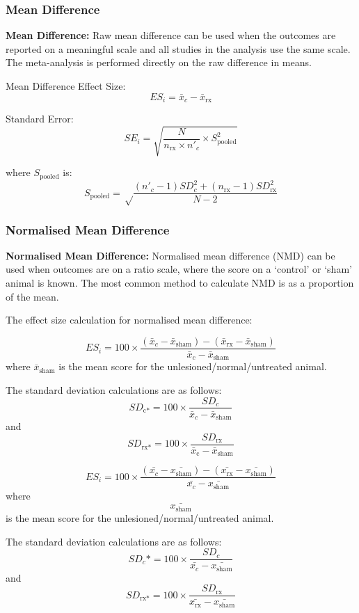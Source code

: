 \documentclass[
]{book}
\begin{document}
\hypertarget{mean-difference}{%
\subsubsection{Mean Difference}\label{mean-difference}}

\textbf{Mean Difference:} Raw mean difference can be used when the outcomes are reported on a meaningful scale and all studies in the analysis use the same scale. The meta-analysis is performed directly on the raw difference in means.

Mean Difference Effect Size:
\[ ES_i = \bar{x}_c - \bar{x}_\text{rx}\]

Standard Error:
\[ SE_i = \sqrt{\frac {N}{n_{\text{rx}} \times n'_c} \times S_{\text{pooled}}^2} \]

where \(S_{\text{pooled}}\) is:
\[S_{\text{pooled}} = \sqrt \frac {(n'_c - 1)SD_c^2 + (n_{\text{rx}} - 1)SD_{\text{rx}}^2}{N -2} \]

\hypertarget{normalised-mean-difference}{%
\subsubsection{Normalised Mean Difference}\label{normalised-mean-difference}}

\textbf{Normalised Mean Difference:} Normalised mean difference (NMD) can be used when outcomes are on a ratio scale, where the score on a `control' or `sham' animal is known. The most common method to calculate NMD is as a proportion of the mean.

The effect size calculation for normalised mean difference:

\[ES_i= 100 \times  \frac {(\bar{x}_c - \bar{x}_\text{sham}) - (\bar{x}_\text{rx} - \bar{x}_\text{sham})}{\bar{x}_c - \bar{x}_\text{sham}}\] where \(\bar{x}_\text{sham}\) is the mean score for the unlesioned/normal/untreated animal.

The standard deviation calculations are as follows:
\[SD_\text{c*} = 100 \times \frac {SD_c}{\bar{x}_c - \bar{x}_\text{sham}}\] and \[SD_\text{rx*} = 100 \times \frac {SD_\text{rx}}{\bar{x}_\text{c} - \bar{x}_\text{sham}}\]

\[ES_i= 100 \times  \frac {(\bar{x_c} - \bar{x_\text{sham}}) - (\bar{x_\text{rx}} - \bar{x_\text{sham}})}{\bar{x_c} - \bar{x_\text{sham}}} \] where \[\bar{x_\text{sham}} \] is the mean score for the unlesioned/normal/untreated animal.

The standard deviation calculations are as follows:
\[SD_c* = 100 \times \frac {SD_c}{\bar{x_c} - \bar{x_\text{sham}}}\] and \[SD_\text{rx*} = 100 \times \frac {SD_\text{rx}}{\bar{x_\text{rx}} - \bar{x_\text{sham}}}\]
\end{document}
